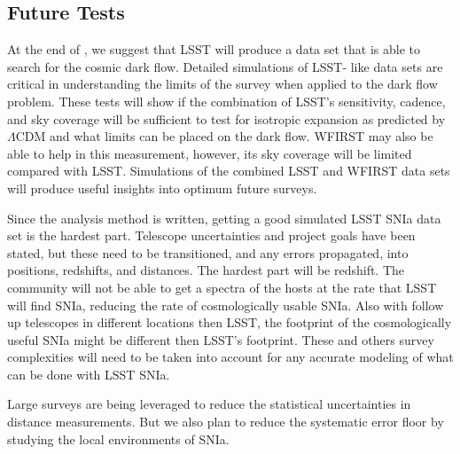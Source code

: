 \documentclass[apj, iop]{emulateapj}
\newcommand{\sn}{SNIa}
\newcommand{\todo}[1]{\textbf{\textcolor{red}{#1}}}
\newcommand{\lcdm}{$\Lambda$CDM}     %
\begin{document}
\subsection{Future Tests}\label{future-tests}

At the end of \cite{Mathews16}, we suggest that LSST will produce a data set
that is able to search for the cosmic dark flow. Detailed simulations of LSST-
like data sets are critical in understanding the limits of the survey when
applied to the dark flow problem. These tests will show if the combination of
LSST's sensitivity, cadence, and sky coverage will be sufficient to test for
isotropic expansion as predicted by \lcdm{} and what limits can be placed on the
dark flow. WFIRST may also be able to help in this measurement, however, its sky
coverage will be limited compared with LSST. Simulations of the combined LSST
and WFIRST data sets will produce useful insights into optimum future surveys.

Since the analysis method is written, getting a good simulated LSST \sn{} data
set is the hardest part. Telescope uncertainties and project goals have been
stated, but these need to be transitioned, and any errors propagated, into
positions,  redshifts, and distances. The hardest part will be redshift. The
community will  not be able to get a spectra of the hosts at the rate that LSST
will find \sn,  reducing the rate of cosmologically usable \sn. Also with follow
up telescopes  in different locations then LSST, the footprint of the
cosmologically useful \sn{} might be different then LSST's footprint. These and
others survey complexities  will need to be taken into account for any accurate
modeling of what can be done with LSST \sn{}.

Large surveys are being leveraged to reduce the statistical uncertainties
in distance measurements. But we also plan to reduce the systematic error floor
by studying the local environments of SNIa.
\end{document}

